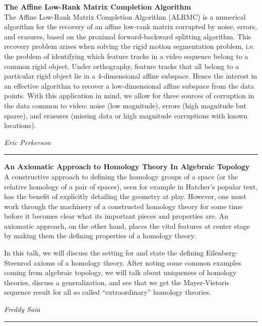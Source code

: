 \documentclass[oneside]{amsart}
\begin{document}
\filbreak
\hspace{-20pt}\textbf{ \textbf{ The Affine Low-Rank Matrix Completion Algorithm } } \vspace{0.5em}\\
The Affine Low-Rank Matrix Completion Algorithm (ALRMC) is a numerical algorithm for the recovery of an affine low-rank matrix corrupted by noise, errors, and erasures, based on the proximal forward-backward splitting algorithm. This recovery problem arises when solving the rigid motion segmentation problem, i.e. the problem of identifying which feature tracks in a video sequence belong to a common rigid object. Under orthography, feature tracks that all belong to a particular rigid object lie in a 4-dimensional affine subspace. Hence the interest in an effective algorithm to recover a low-dimensional affine subspace from the data points. With this application in mind, we allow for three sources of corruption in the data common to video: noise (low magnitude), errors (high magnitude but sparse), and erasures (missing data or high magnitude corruptions with known locations). \vspace{-1em}\\
\begin{flushright} \textit{ Eric Perkerson } \vspace{0.5em} \end{flushright}
\rule{\textwidth}{0.4pt}
\vspace{0.5em}

\filbreak
\hspace{-20pt}\textbf{ \textbf{ An Axiomatic Approach to Homology Theory In Algebraic Topology } } \vspace{0.5em}\\
A constructive approach to defining the homology groups of a space (or the relative homology of a pair of spaces), seen for example in Hatcher's popular text, has the benefit of explicitly detailing the geometry at play. However, one must work through the machinery of a constructed homology theory for some time before it becomes clear what its important pieces and properties are. An axiomatic approach, on the other hand, places the vital features at center stage by making them the defining properties of a homology theory.  

In this talk, we will discuss the setting for and state the defining Eilenberg-Steenrod axioms of a homology theory. After noting some common examples coming from algebraic topology, we will talk about uniqueness of homology theories, discuss a generalization, and see that we get the Mayer-Vietoris sequence result for all so called ``extraordinary'' homology theories. \vspace{-1em}\\
\begin{flushright} \textit{ Freddy Saia } \vspace{0.5em} \end{flushright}
\rule{\textwidth}{0.4pt}
\vspace{0.5em}
\end{document}
